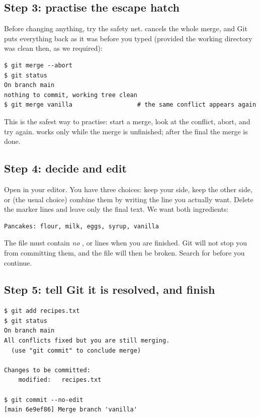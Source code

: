 \subsection{Step 3: practise the escape hatch}

Before changing anything, try the safety net.  cancels the whole merge, and Git puts everything back as it was before you typed  (provided the working directory was clean then, as we required):

\begin{lstlisting}
$ git merge --abort
$ git status
On branch main
nothing to commit, working tree clean
$ git merge vanilla                  # the same conflict appears again
\end{lstlisting}

This is the safest way to practise: start a merge, look at the conflict, abort, and try again.  works only while the merge is unfinished; after the final  the merge is done.

\subsection{Step 4: decide and edit}

Open  in your editor. You have three choices: keep your side, keep the other side, or (the usual choice) combine them by writing the line you actually want. Delete the marker lines and leave only the final text. We want both ingredients:

\begin{lstlisting}
Pancakes: flour, milk, eggs, syrup, vanilla
\end{lstlisting}

\begin{pitfall}
The file must contain \emph{no} \code{<<<<<<<}, \code{=======} or \code{>>>>>>>} lines when you are finished. Git will not stop you from committing them, and the file will then be broken. Search for \code{<<<<} before you continue.
\end{pitfall}

\subsection{Step 5: tell Git it is resolved, and finish}

\begin{lstlisting}
$ git add recipes.txt
$ git status
On branch main
All conflicts fixed but you are still merging.
  (use "git commit" to conclude merge)

Changes to be committed:
	modified:   recipes.txt

$ git commit --no-edit
[main 6e9ef86] Merge branch 'vanilla'
\end{lstlisting}

